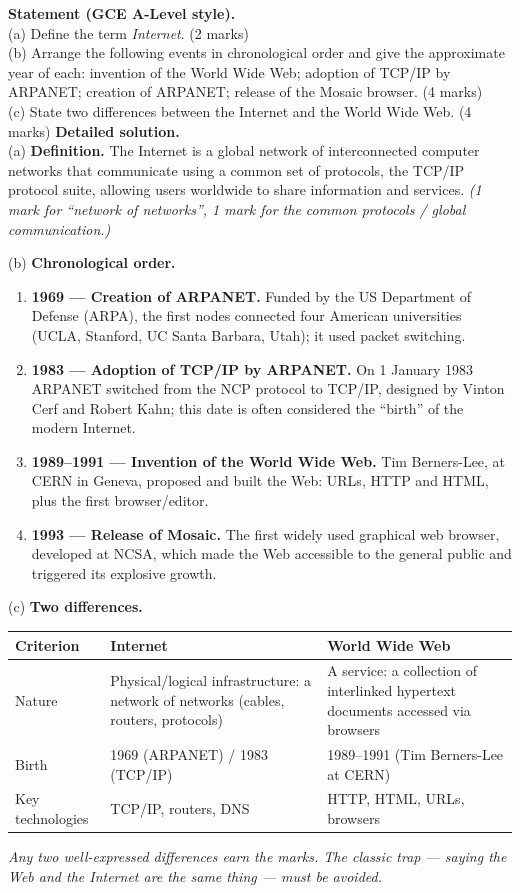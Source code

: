 \documentclass[11pt]{article}
\begin{document}
\begin{exoresolu}
\textbf{Statement (GCE A-Level style).}\\
(a) Define the term \emph{Internet}. \hfill (2 marks)\\
(b) Arrange the following events in chronological order and give the approximate year of each: invention of the World Wide Web; adoption of TCP/IP by ARPANET; creation of ARPANET; release of the Mosaic browser. \hfill (4 marks)\\
(c) State two differences between the Internet and the World Wide Web. \hfill (4 marks)
\tcblower
\textbf{Detailed solution.}\\
(a) \textbf{Definition.} The Internet is a global network of interconnected computer networks that communicate using a common set of protocols, the TCP/IP protocol suite, allowing users worldwide to share information and services. \emph{(1 mark for ``network of networks'', 1 mark for the common protocols / global communication.)}

(b) \textbf{Chronological order.}
\begin{enumerate}
\item \textbf{1969 — Creation of ARPANET.} Funded by the US Department of Defense (ARPA), the first nodes connected four American universities (UCLA, Stanford, UC Santa Barbara, Utah); it used packet switching.
\item \textbf{1983 — Adoption of TCP/IP by ARPANET.} On 1 January 1983 ARPANET switched from the NCP protocol to TCP/IP, designed by Vinton Cerf and Robert Kahn; this date is often considered the ``birth'' of the modern Internet.
\item \textbf{1989--1991 — Invention of the World Wide Web.} Tim Berners-Lee, at CERN in Geneva, proposed and built the Web: URLs, HTTP and HTML, plus the first browser/editor.
\item \textbf{1993 — Release of Mosaic.} The first widely used graphical web browser, developed at NCSA, which made the Web accessible to the general public and triggered its explosive growth.
\end{enumerate}

(c) \textbf{Two differences.}
\begin{center}
\begin{tabularx}{\linewidth}{|l|X|X|}
\hline
\rowcolor{popblueL} \textbf{Criterion} & \textbf{Internet} & \textbf{World Wide Web} \\
\hline
Nature & Physical/logical infrastructure: a network of networks (cables, routers, protocols) & A service: a collection of interlinked hypertext documents accessed via browsers \\
\hline
Birth & 1969 (ARPANET) / 1983 (TCP/IP) & 1989--1991 (Tim Berners-Lee at CERN) \\
\hline
Key technologies & TCP/IP, routers, DNS & HTTP, HTML, URLs, browsers \\
\hline
\end{tabularx}
\end{center}
\emph{Any two well-expressed differences earn the marks. The classic trap — saying the Web and the Internet are the same thing — must be avoided.}
\end{exoresolu}
\end{document}
